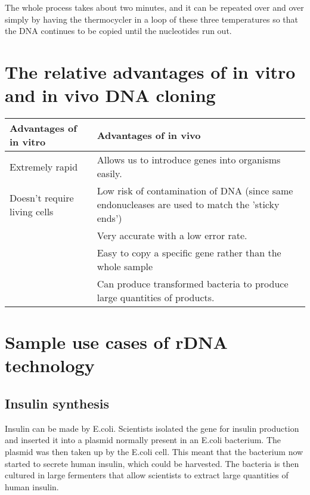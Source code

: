 \documentclass{article}
\begin{document}
The whole process takes about two minutes, and it can be repeated over and over
simply by having the thermocycler in a loop of these three temperatures so that
the DNA continues to be copied until the nucleotides run out.

\section*{The relative advantages of in vitro and in vivo DNA cloning}

\begin{tabular}{|p{5.6cm}|p{5.6cm}|}
	
	\hline

	{\bf Advantages of in vitro} & {\bf Advantages of in vivo} \\ \hline

	Extremely rapid & Allows us to introduce genes into organisms easily. \\
	\hline

	Doesn't require living cells & Low risk of contamination of DNA (since same
	endonucleases are used to match the 'sticky ends') \\ \hline

	& Very accurate with a low error rate. \\ \hline

	& Easy to copy a specific gene rather than the whole sample \\ \hline

	& Can produce transformed bacteria to produce large quantities of products.
	\\ \hline

\end{tabular}

\section*{Sample use cases of rDNA technology}
\subsection*{Insulin synthesis}

Insulin can be made by E.coli. Scientists isolated the gene for insulin
production and inserted it into a plasmid normally present in an E.coli
bacterium. The plasmid was then taken up by the E.coli cell. This meant that the
bacterium now started to secrete human insulin, which could be harvested. The
bacteria is then cultured in large fermenters that allow scientists to extract
large quantities of human insulin.
\end{document}
